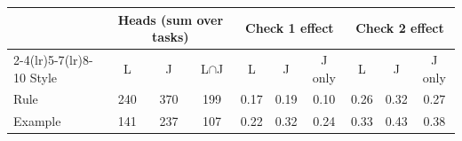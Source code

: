 \begin{tabular}{@{}lccccccccc@{}}
\toprule
 & \multicolumn{3}{c}{Heads (sum over tasks)} & \multicolumn{3}{c}{Check 1 effect} & \multicolumn{3}{c}{Check 2 effect} \\
\cmidrule(lr){2-4}\cmidrule(lr){5-7}\cmidrule(lr){8-10}
Style & L & J & L$\cap$J & L & J & J only & L & J & J only \\
\midrule
Rule & 240 & 370 & 199 & 0.17 & 0.19 & 0.10 & 0.26 & 0.32 & 0.27 \\
Example & 141 & 237 & 107 & 0.22 & 0.32 & 0.24 & 0.33 & 0.43 & 0.38 \\
\bottomrule
\end{tabular}
